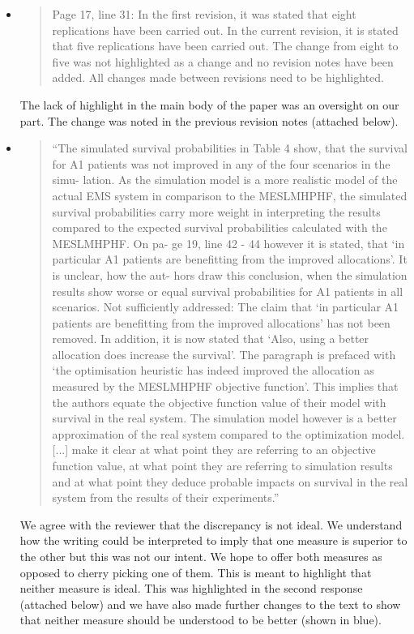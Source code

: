 \documentclass{article}
\begin{document}
\begin{itemize}
  \item \begin{quote}
  Page 17, line 31: In the first revision, it was stated that eight replications have been carried out. In the current revision, it is stated that five replications have been carried out. The change from eight to five was not highlighted as a change and no revision notes have been added. All changes made between revisions need to be highlighted.
  \end{quote}
  The lack of highlight in the main body of the paper was an oversight on our part. The change was noted in the previous revision notes (attached below).



  \item \begin{quote}
  ``The simulated survival probabilities in Table 4 show, that the survival for A1 patients was not improved in any of the four scenarios in the simu- lation. As the simulation model is a more realistic model of the actual EMS system in comparison to the MESLMHPHF, the simulated survival probabilities carry more weight in interpreting the results compared to the expected survival probabilities calculated with the MESLMHPHF. On pa- ge 19, line 42 - 44 however it is stated, that ‘in particular A1 patients are benefitting from the improved allocations’. It is unclear, how the aut- hors draw this conclusion, when the simulation results show worse or equal survival probabilities for A1 patients in all scenarios. Not sufficiently addressed: The claim that ‘in particular A1 patients are benefitting from the improved allocations’ has not been removed. In addition, it is now stated that ‘Also, using a better allocation does increase the survival’. The paragraph is prefaced with ‘the optimisation heuristic has indeed improved the allocation as measured by the MESLMHPHF objective function’. This implies that the authors equate the objective function value of their model with survival in the real system. The simulation model however is a better approximation of the real system compared to the optimization model. [...] make it clear at what point they are referring to an objective function value, at what point they are referring to simulation results and  at what point they deduce probable impacts on survival in the real system from the results of their experiments.''
  \end{quote}

  We agree with the reviewer that the discrepancy is not ideal. We understand how the writing could be interpreted to imply that one measure is superior to the other but this was not our intent. We hope to offer both measures as opposed to cherry picking one of them. This is meant to highlight that neither measure is ideal. This was highlighted in the second response (attached below) and we have also made further changes to the text to show that neither measure should be understood to be better (shown in blue).


\end{itemize}
\end{document}
